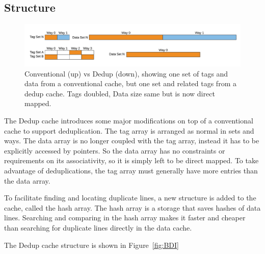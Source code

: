 \subsection{Structure}
\label{ssec:DedupStructure}
\begin{figure}
    \includegraphics[width=\textwidth]{Dedup.pdf}
    \caption[Dedup Cache]{Conventional (up) vs Dedup (down), showing one set of tags and data from a conventional cache, but one set and related tags from a dedup cache. Tags doubled, Data size same but is now direct mapped.}
    \label{fig:Dedup}
\end{figure}
The Dedup cache introduces some major modifications on top of a conventional cache to support deduplication. The tag array is arranged as normal in sets and ways. The data array is no longer coupled with the tag array, instead it has to be explicitly accessed by pointers. So the data array has no constraints or requirements on its associativity, so it is simply left to be direct mapped. To take advantage of deduplications, the tag array must generally have more entries than the data array.\par
To facilitate finding and locating duplicate lines, a new structure is added to the cache, called the hash array. The hash array is a storage that saves hashes of data lines. Searching and comparing in the hash array makes it faster and cheaper than searching for duplicate lines directly in the data cache.

The Dedup cache structure is shown in Figure~\ref{fig:BDI}

